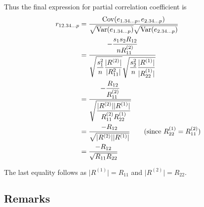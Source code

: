 \documentclass[10pt]{article}
\begin{document}
Thus the final expression for partial correlation coefficient is
\begin{align}
	r_{12.34\dots p} &= \frac{\Cov(e_{1.34\dots p}, e_{2.34\dots p})}{\sqrt{\Var(e_{1.34\dots p})}\sqrt{\Var(e_{2.34\dots p})}} \notag \\
			 &= \dfrac{-\dfrac{s_1 s_2 R_{12}}{n R_{11}^{(2)}}}{\sqrt{\dfrac{s_1^{2}}{n} \dfrac{\lvert R^{(2)} \rvert }{\lvert R_{11}^{2} \rvert }} \sqrt{\dfrac{s_2^2}{n} \dfrac{\lvert R^{(1)} \rvert }{\lvert R_{22}^{(1)} \rvert }}} \notag \\
			 &= \dfrac{-\dfrac{R_{12}}{R_{11}^{(2)}}}{\sqrt{\dfrac{\lvert R^{(2)} \rvert \lvert R^{(1)} \rvert }{R_{11}^{(2)}R_{22}^{(1)}}}} \notag \\
			 &= \frac{-R_{12}}{\sqrt{\lvert R^{(2)} \rvert \lvert R^{(1)} \rvert }} \tag*{(since \( R_{22}^{(1)} = R_{11}^{(2)} \))} \\
			 &= \frac{-R_{12}}{\sqrt{R_{11}R_{22}}}
\end{align}

The last equality follows as \( \lvert R^{(1)} \rvert = R_{11} \) and \( \lvert R^{(2)} \rvert = R_{22} \).

\subsection{Remarks}
\end{document}
